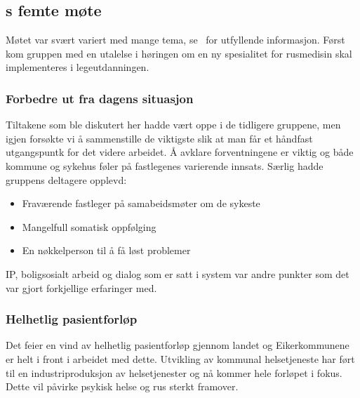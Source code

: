 \documentclass[11pt]{report} %
\begin{document}
                  \subsection{s femte møte}\label{sec:agr_5}
                    Møtet var svært variert med mange tema, se~\cite{arbgr_mref-5} for utfyllende informasjon. Først kom gruppen med en utalelse i høringen om en ny spesialitet for rusmedisin skal implementeres i legeutdanningen.\\
                    \subsubsection{Forbedre ut fra dagens situasjon}
                      Tiltakene som ble diskutert her hadde vært oppe i de tidligere gruppene, men igjen forsøkte vi å sammenstille de viktigste slik at man får et håndfast utgangspuntk for det videre arbeidet. Å avklare forventningene er viktig og både kommune og sykehus føler på fastlegenes varierende innsats. Særlig hadde gruppens deltagere opplevd:\\
                        \begin{itemize}
                          \item Fraværende fastleger på samabeidsmøter om de sykeste\\
                          \item Mangelfull somatisk oppfølging\\
                          \item En nøkkelperson til å få løst problemer\\
                        \end{itemize}
                      IP, boligsosialt arbeid og dialog som er satt i system var andre punkter som det var gjort forkjellige erfaringer med. 
                    \subsubsection{Helhetlig pasientforløp}
                     Det feier en vind av helhetlig pasientforløp gjennom landet og Eikerkommunene er helt i front i arbeidet med dette. Utvikling av kommunal helsetjeneste har ført til en industriproduksjon av helsetjenester og nå kommer hele forløpet i fokus. Dette vil påvirke psykisk helse og rus sterkt framover. 
\end{document}

